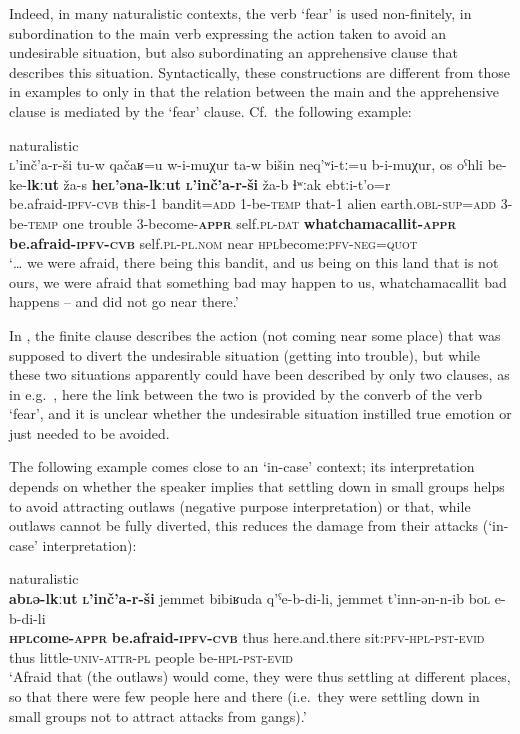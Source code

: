 \documentclass[output=paper,colorlinks,citecolor=brown]{langscibook}
\begin{document}
Indeed, in many naturalistic contexts, the verb `fear' is used non-finitely, in subordination to the main verb expressing the action taken to avoid an undesirable situation, but also subordinating an apprehensive clause that describes this situation. Syntactically, these constructions are different from those in examples  to  only in that the relation between the main and the apprehensive clause is mediated by the `fear' clause. Cf.\ the following example:

\ea \label{ex:DD27} \textnormal{naturalistic} \\
\gll  \textsc{l}'inč'a-r-ši tu-w qačaʁ=u w-i-muχur
ta-w bišin neq’ʷi-tː=u b-i-muχur, os oˁhli be-ke-\textbf{lkːut}
ža-s \textbf{he\textsc{l}'əna-lkːut} \textbf{\textsc{l}'inč'a-r-ši} 
ža-b ɬʷːak e{\textlangle}b{\textrangle}tːi-t'o=r \\
 be.afraid-\textsc{ipfv-cvb} this-1 bandit=\textsc{add} 1-be-\textsc{temp} 
that-1 alien earth.\textsc{obl-sup=add} 3-be-\textsc{temp} one trouble 3-become-\textsc{\textbf{appr}} self.\textsc{pl-dat} \textbf{whatchamacallit-\textsc{appr}} \textbf{be.afraid-\textsc{ipfv-cvb}} 
self.\textsc{pl-pl.nom} near {\textlangle}\textsc{hpl}{\textrangle}become:\textsc{pfv-neg=quot} \\
\glt `… we were afraid, there being this bandit, and us being on this land that is not ours, we were afraid that something bad may happen to us, whatchamacallit bad happens -- and did not go near there.'
\z


\noindent In , the finite clause describes the action (not coming near some place) that was supposed to divert the undesirable situation (getting into trouble), but while these two situations apparently could have been described by only two clauses, as in e.g.\  , here the link between the two is provided by the converb of the verb `fear', and it is unclear whether the undesirable situation instilled true emotion or just needed to be avoided.

The following example comes close to an `in-case' context; its interpretation depends on whether the speaker implies that settling down in small groups helps to avoid attracting outlaws (negative purpose interpretation) or that, while outlaws cannot be fully diverted, this reduces the damage from their attacks (`in-case' interpretation):

\begin{exe} \ex \label{ex:DD28} \textnormal{naturalistic}\\
\gll \textbf{a{\textlangle}b{\textrangle}\textsc{l}ə-lkːut} \textbf{\textsc{l}'inč'a-r-ši} jemmet bibiʁuda q'ˁe-b-di-li, jemmet t'inn-ən-n-ib bo\textsc{l} e-b-di-li\\
{\textlangle}\textbf{\textsc{hpl}{\textrangle}come-\textsc{appr}} \textbf{be.afraid-\textsc{ipfv-cvb}} thus here.and.there sit:\textsc{pfv-hpl-pst-evid} thus little-\textsc{univ-attr-pl} people be-\textsc{hpl-pst-evid}\\
\glt `Afraid that (the outlaws) would come, they were thus settling at different places, so that there were few people here and there (i.e.\ they were settling down in small groups not to attract attacks from gangs).'
\end{exe}
\end{document}
